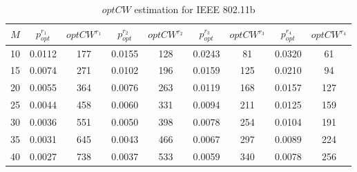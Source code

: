 \begin{table}[!htb]
\caption{$optCW$ estimation for IEEE 802.11b}
\begin{center}
\scalebox{0.65}
{\begin{tabular}{|c|c|c|c|c|c|c|c|c|}
\hline
{$M$}
& {$p_{opt}^{r_{1}}$} & \small{$optCW^{r_{1}}$}
& {$p_{opt}^{r_{2}}$} & \small{$optCW^{r_{2}}$}
& {$p_{opt}^{r_{3}}$} & \small{$optCW^{r_{3}}$}
& {$p_{opt}^{r_{4}}$} & \small{$optCW^{r_{4}}$} \\
\hline\hline
{10} & {0.0112} & {177} &{0.0155}&{128}&{0.0243}&{81}&{0.0320}&{61} \\
\hline
{15} & {0.0074} & {271}&{0.0102}&{196}&{0.0159}&{125}&{0.0210}&{94} \\
\hline
{20} & {0.0055} & {364}&{0.0076}&{263}&{0.0119}&{168}&{0.0157}&{127} \\
\hline
{25} & {0.0044} & {458} &{0.0060}&{331}&{0.0094}&{211}&{0.0125}&{159} \\
\hline
{30} & {0.0036} & {551}&{0.0050}&{398}&{0.0078}&{254}&{0.0104}&{191} \\
\hline
{35} & {0.0031} & {645}&{0.0043}&{466}&{0.0067}&{297}&{0.0089}&{224} \\
\hline
{40} & {0.0027} & {738}&{0.0037}&{533}&{0.0059}&{340}&{0.0078}&{256} \\
\hline
\end{tabular}}
\vspace{-0.2cm}
\end{center}
\label{table:optCW}
\end{table}


